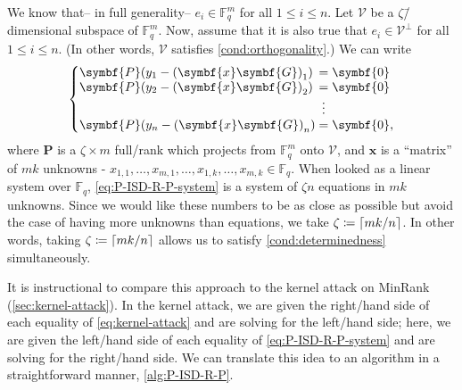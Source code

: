 \documentclass[version=last, paper=A4, parskip=half, oneside]{scrbook}
\theoremstyle{plain}
\theoremstyle{definition}
\theoremstyle{remark}
\renewcommand*{\vec}{\symbf}
\newcommand*{\mat}{\symbf}
\newcommand*{\FF}{\ensuremath{\mathbb{F}}}
\DeclarePairedDelimiter{\ceil}{\lceil}{\rceil}
\begin{document}
We know that\--- in full generality\--- \(e_i \in \FF_q^m\) for all
\(1 \le i \le n\).  Let \(\mathcal{V}\) be a \(\zeta\)\=/dimensional subspace
of \(\FF_q^m\).  Now, assume that it is also true that
\(e_i \in \mathcal{V}^{\perp}\) for all \(1 \le i \le n\).  (In other words,
\(\mathcal{V}\) satisfies \cref{cond:orthogonality}.)  We can write
\begin{equation}\label{eq:P-ISD-R-P-system}
  \setlength{\arraycolsep}{0pt}
  \newcolumntype{B}{>{{}}c<{{}}}
  \left\{
    \begin{array}{l B l}
      \mat{P} (y_1 - {(\vec{x} \mat{G})}_1) & = & \vec{0} \\
      \mat{P} (y_2 - {(\vec{x} \mat{G})}_2) & = & \vec{0} \\
                                            & \vdots & \\
      \mat{P} (y_n - {(\vec{x} \mat{G})}_n) & = & \vec{0}\text,
    \end{array}
  \right.
\end{equation}
where \(\mat{P}\) is a \(\zeta \times m\) full\-/rank which projects from
\(\FF_q^m\) onto \(\mathcal{V}\), and \(\vec{x}\) is a \enquote{matrix} of
\(m k\) unknowns \--{}
\(x_{1, 1}, \ldots, x_{m, 1}, \ldots, x_{1, k}, \ldots, x_{m, k} \in \FF_{q}\).
When looked as a linear system over \(\FF_q\), \cref{eq:P-ISD-R-P-system} is a
system of \(\zeta n\) equations in \(m k\) unknowns.  Since we would like these
numbers to be as close as possible but avoid the case of having more unknowns
than equations, we take \(\zeta \coloneqq \ceil{m k / {n}}\).  In other words,
taking \(\zeta \coloneqq \ceil{m k / {n}}\) allows us to satisfy
\cref{cond:determinedness} simultaneously.

It is instructional to compare this approach to the kernel attack on MinRank
(\cref{sec:kernel-attack}).  In the kernel attack, we are given the
right\-/hand side of each equality of \cref{eq:kernel-attack} and are solving
for the left\-/hand side; here, we are given the left\-/hand side of each
equality of \cref{eq:P-ISD-R-P-system} and are solving for the right\-/hand
side.  We can translate this idea to an algorithm in a straightforward manner,
\cref{alg:P-ISD-R-P}.
\end{document}
